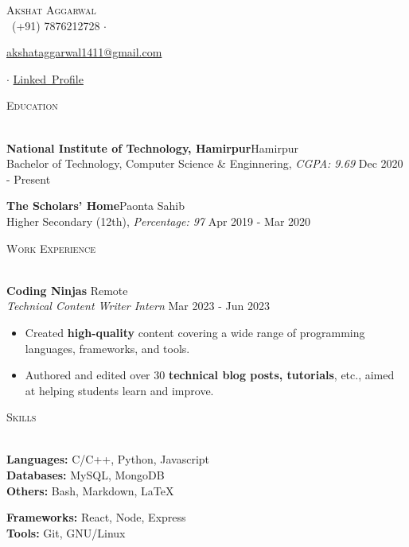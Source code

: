 \documentclass[a4paper]{article}
\newcommand{\bulletSep} { \vspace{2.2mm} }
\newcommand{\sectionSep} { \vspace{3mm} }
\newcommand{\lineunder} {
    \vspace*{-8pt} \\
    \hspace*{-15pt} \hrulefill \\
}
\newcommand{\header} [1] {
    {\hspace*{-18pt}\vspace*{6pt} {
        \fontfamily{qcs}\selectfont \large \scshape #1
    }}
    \vspace*{-6pt} \lineunder
    \vspace{0.5mm}
}
\newcommand{\educationItem}[5]{
    \textbf{#1}\hfill #2\\
    #3, \textit{#4} \hfill #5\\
}
\newcommand{\experienceItem}[5]{
    \textbf{#1} \hfill #2 \\
    \textit{#3} \hfill #4 \\
    \begin{itemize}
        #5
    \end{itemize}
}
\newcommand{\link}[2]{
    {\fontfamily{lmtt}\selectfont\href{#1}{#2}}
}
\begin{document}

\begin{center}
    {\Huge \scshape {}\selectfont Akshat Aggarwal}\\
    \vspace{0.5mm}
    \faPhone~(+91) 7876212728
    $\cdot$
    \link{mailto:akshataggarwal1411@gmail.com}{akshataggarwal1411@gmail.com}
    $\cdot$
    \href{https://www.linkedin.com/in/akshataggarwal1411/}{Linked\faLinkedinSquare~Profile}
\end{center}

\vspace{-2mm}


\header{Education}

\educationItem{National Institute of Technology, Hamirpur}{Hamirpur}{Bachelor of Technology, Computer Science \& Enginnering}{CGPA: 9.69}{Dec 2020 - Present}
\bulletSep

\educationItem{The Scholars' Home}{Paonta Sahib}{Higher Secondary (12th)}{Percentage: 97}{Apr 2019 - Mar 2020}
\sectionSep


\header{Work Experience}

\experienceItem{Coding Ninjas}{Remote}{Technical Content Writer Intern}{Mar 2023 - Jun 2023}{
    \item Created \textbf{high-quality} content covering a wide range of programming languages, frameworks, and tools.
    \item Authored and edited over 30 \textbf{technical blog posts, tutorials}, etc., aimed at helping students learn and improve.
}
\bulletSep



\header{Skills}
\begin{minipage}[t]{0.6\textwidth}
    \textbf{Languages:} C/C++, Python, Javascript\\
    \textbf{Databases:} MySQL, MongoDB\\
    \textbf{Others:} Bash, Markdown, \LaTeX
\end{minipage}
\hfill
\begin{minipage}[t]{0.33\textwidth}
    \textbf{Frameworks:} React, Node, Express\\
    \textbf{Tools:} Git, GNU/Linux
\end{minipage}
\sectionSep
\end{document}
